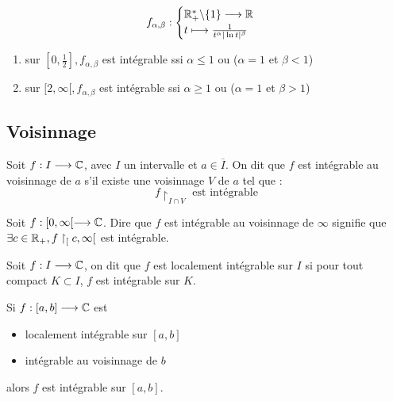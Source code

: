 \begin{example}
    \[ f_{\alpha, \beta} :
        \begin{cases}
            \mathbb{R}_+^* \backslash \{1\} \longrightarrow \mathbb{R} \\
            t \longmapsto \frac{1}{t^\alpha | \ln t |^\beta}
        \end{cases}
    \] 
    \begin{enumerate}
        \item sur $[0, \frac{1}{2}], f_{\alpha,\beta}$ est intégrable ssi $\alpha \le 1$ ou ($\alpha = 1$ et $ \beta < 1$)
        \item sur $[2, \infty[, f_{\alpha,\beta}$ est intégrable ssi $\alpha \ge 1$ ou ($\alpha = 1$ et $ \beta > 1$)
    \end{enumerate}
\end{example}
\newpage

\subsection{Voisinnage}

\begin{definition}
    Soit $f : I \longrightarrow \mathbb{C}$, avec $I$ un intervalle et $a \in \overline{I}$. On dit que $f$ est intégrable au voisinnage de $a$ s'il existe 
    une voisinnage $V$ de $a$ tel que :
        \[ f\restriction_{{I \cap V}} \text{ est intégrable} \] 
\end{definition}

\begin{example}
    Soit $f : [0, \infty[ \longrightarrow \mathbb{C}$. 
    Dire que $f$ est intégrable au voisinnage de $\infty$ signifie que $\exists c \in \mathbb{R}_+, f\restriction_[c, \infty[$ est intégrable.
\end{example}

\begin{definition}
    Soit $f : I \longrightarrow \mathbb{C}$, on dit que $f$ est localement intégrable sur $I$ si pour tout compact $K \subset I$, $f$ est intégrable sur $K$.
\end{definition}


\begin{remark}
    Si $f : [a,b] \longrightarrow \mathbb{C}$ est 
    \begin{itemize}
        \item localement intégrable sur $[a,b]$
        \item intégrable au voisinnage de $b$
    \end{itemize}
    alors $f$ est intégrable sur $[a,b]$.
\end{remark}

